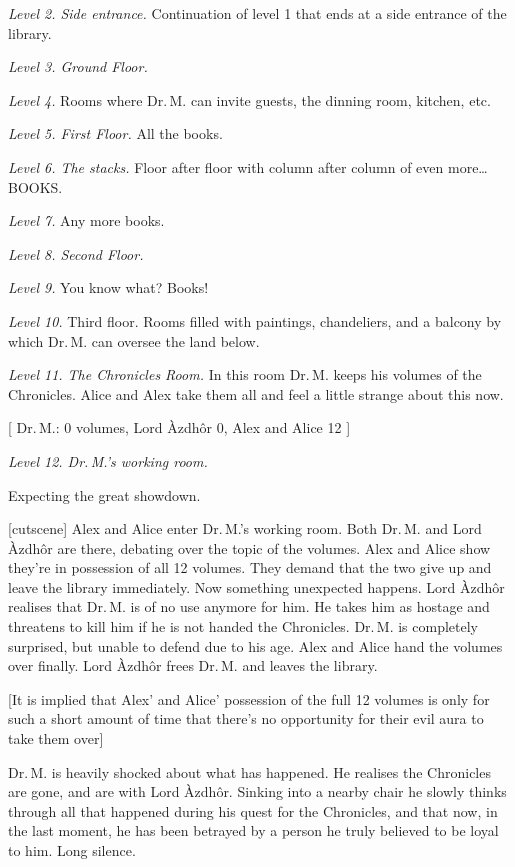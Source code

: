 \documentclass{gd-document}
\newcommand\DrM{Dr.\,M.\xspace}
\newcommand\Azdhor{Lord Àzdhôr\xspace}
\newcommand\level[1]{\textit{#1}}
\begin{document}
\level{Level 2. Side entrance.} Continuation of level 1 that ends at a
side entrance of the library.

\level{Level 3. Ground Floor.}

\level{Level 4.} Rooms where \DrM can invite guests, the dinning room,
kitchen, etc.

\level{Level 5. First Floor.} All the books.

\level{Level 6. The stacks.} Floor after floor with column after
column of even more… BOOKS.

\level{Level 7.} Any more books.

\level{Level 8. Second Floor.}

\level{Level 9.} You know what? Books!

\level{Level 10.} Third floor. Rooms filled with paintings,
chandeliers, and a balcony by which \DrM can oversee the land below.

\level{Level 11. The Chronicles Room.} In this room \DrM keeps his
volumes of the Chronicles. Alice and Alex take them all and feel a
little strange about this now.

[ \DrM: 0 volumes, \Azdhor 0, Alex and Alice 12 ]

\level{Level 12. \DrM’s working room.}

Expecting the great showdown.

[cutscene]
Alex and Alice enter \DrM{}’s working room. Both \DrM and \Azdhor are
there, debating over the topic of the volumes. Alex and Alice show
they’re in possession of all 12 volumes. They demand that the two give
up and leave the library immediately. Now something unexpected
happens. \Azdhor realises that \DrM is of no use anymore for him. He
takes him as hostage and threatens to kill him if he is not handed the
Chronicles. \DrM is completely surprised, but unable to defend due to
his age. Alex and Alice hand
the volumes over finally. \Azdhor frees \DrM and leaves the library.

[It is implied that Alex’ and Alice’ possession of the full 12 volumes
is only for such a short amount of time that there’s no opportunity
for their evil aura to take them over]

\DrM is heavily shocked about what has happened. He realises the
Chronicles are gone, and are with \Azdhor. Sinking into a nearby chair
he slowly thinks through all that happened during his quest for the
Chronicles, and that now, in the last moment, he has been betrayed by
a person he truly believed to be loyal to him. Long silence.
\end{document}
